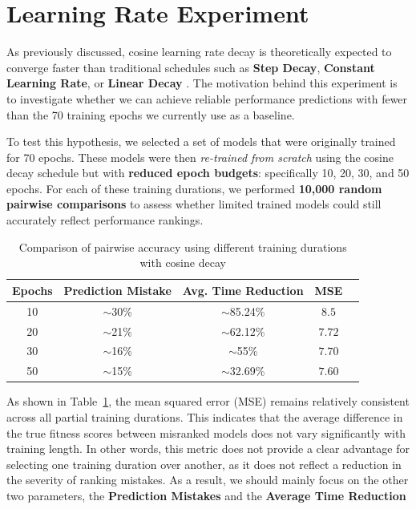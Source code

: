 \clearpage

\section{Learning Rate Experiment}

As previously discussed, cosine learning rate decay is theoretically expected to converge faster than traditional schedules such as \textbf{Step Decay}, \textbf{Constant Learning Rate}, or \textbf{Linear Decay} \cite{li2019exponential}  \cite{kim2021automated}. The motivation behind this experiment is to investigate whether we can achieve reliable performance predictions with fewer than the 70 training epochs we currently use as a baseline.

To test this hypothesis, we selected a set of models that were originally trained for 70 epochs. These models were then \textit{re-trained from scratch} using the cosine decay schedule but with \textbf{reduced epoch budgets}: specifically 10, 20, 30, and 50 epochs. For each of these training durations, we performed \textbf{10,000 random pairwise comparisons} to assess whether limited trained models could still accurately reflect performance rankings.


\begin{table}[ht]
\centering
\begin{tabular}{|c|c|c|c|p{8.5cm}}
\hline
\textbf{Epochs} & \textbf{Prediction Mistake} & \textbf{Avg. Time Reduction} & \textbf{MSE} \\
\hline
10 & $\sim$30\% & $\sim$85.24\% & \( 8.5 \) \\
20 & $\sim$21\% & $\sim$62.12\% & \( 7.72 \) \\
30 & $\sim$16\% & $\sim$55\%    & \( 7.70 \) \\
50 & $\sim$15\% & $\sim$32.69\% & \( 7.60 \) \\
\hline
\end{tabular}
\caption{Comparison of  pairwise accuracy using different training durations with cosine decay}
\label{tab:cosine_decay_results}
\end{table}


As shown in Table~\ref{tab:cosine_decay_results}, the mean squared error (MSE)  remains relatively consistent across all partial training durations. This indicates that the average difference in the true fitness scores between misranked models does not vary significantly with training length. In other words, this metric does not provide a clear advantage for selecting one training duration over another, as it does not reflect a reduction in the severity of ranking mistakes. As a result, we should mainly focus on the other two parameters, the \textbf{Prediction Mistakes} and the \textbf{Average Time Reduction}


